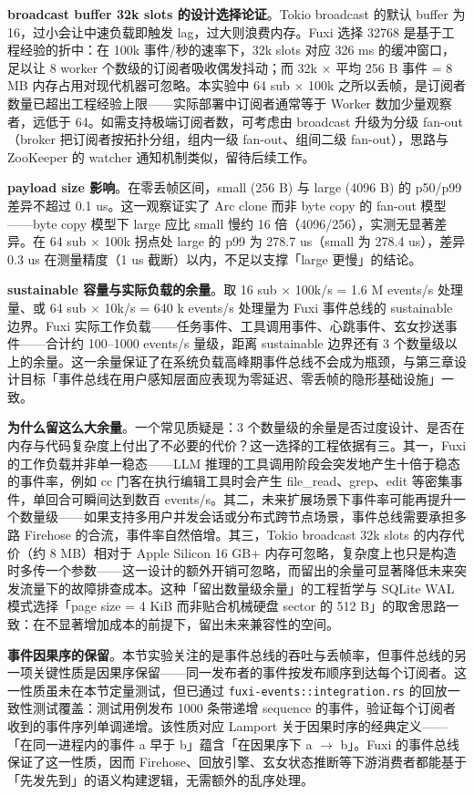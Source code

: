 \textbf{broadcast buffer 32k slots 的设计选择论证}。Tokio broadcast 的默认 buffer 为 16，过小会让中速负载即触发 lag，过大则浪费内存。Fuxi 选择 32768 是基于工程经验的折中：在 100k 事件/秒的速率下，32k slots 对应 326 ms 的缓冲窗口，足以让 8 worker 个数级的订阅者吸收偶发抖动；而 32k × 平均 256 B 事件 = 8 MB 内存占用对现代机器可忽略。本实验中 64 sub × 100k 之所以丢帧，是订阅者数量已超出工程经验上限——实际部署中订阅者通常等于 Worker 数加少量观察者，远低于 64。如需支持极端订阅者数，可考虑由 broadcast 升级为分级 fan-out（broker 把订阅者按拓扑分组，组内一级 fan-out、组间二级 fan-out），思路与 ZooKeeper 的 watcher 通知机制类似\cite{hunt2010zookeeper}，留待后续工作。

\textbf{payload size 影响}。在零丢帧区间，small (256 B) 与 large (4096 B) 的 p50/p99 差异不超过 0.1 us。这一观察证实了 Arc clone 而非 byte copy 的 fan-out 模型——byte copy 模型下 large 应比 small 慢约 16 倍（4096/256），实测无显著差异。在 64 sub × 100k 拐点处 large 的 p99 为 278.7 us（small 为 278.4 us），差异 0.3 us 在测量精度（1 us 截断）以内，不足以支撑「large 更慢」的结论。

\textbf{sustainable 容量与实际负载的余量}。取 16 sub × 100k/s = 1.6 M events/s 处理量、或 64 sub × 10k/s = 640 k events/s 处理量为 Fuxi 事件总线的 sustainable 边界。Fuxi 实际工作负载——任务事件、工具调用事件、心跳事件、玄女抄送事件——合计约 100--1000 events/s 量级，距离 sustainable 边界还有 3 个数量级以上的余量。这一余量保证了在系统负载高峰期事件总线不会成为瓶颈，与第三章设计目标「事件总线在用户感知层面应表现为零延迟、零丢帧的隐形基础设施」一致。

\textbf{为什么留这么大余量}。一个常见质疑是：3 个数量级的余量是否过度设计、是否在内存与代码复杂度上付出了不必要的代价？这一选择的工程依据有三。其一，Fuxi 的工作负载并非单一稳态——LLM 推理的工具调用阶段会突发地产生十倍于稳态的事件率，例如 cc 门客在执行编辑工具时会产生 file\_read、grep、edit 等密集事件，单回合可瞬间达到数百 events/s。其二，未来扩展场景下事件率可能再提升一个数量级——如果支持多用户并发会话或分布式跨节点场景\cite{corbett2012spanner}，事件总线需要承担多路 Firehose 的合流，事件率自然倍增。其三，Tokio broadcast 32k slots 的内存代价（约 8 MB）相对于 Apple Silicon 16 GB+ 内存可忽略，复杂度上也只是构造时多传一个参数——这一设计的额外开销可忽略，而留出的余量可显著降低未来突发流量下的故障排查成本。这种「留出数量级余量」的工程哲学与 SQLite WAL 模式选择「page size = 4 KiB 而非贴合机械硬盘 sector 的 512 B」\cite{sqlite2024wal}的取舍思路一致：在不显著增加成本的前提下，留出未来兼容性的空间。

\textbf{事件因果序的保留}。本节实验关注的是事件总线的吞吐与丢帧率，但事件总线的另一项关键性质是因果序保留——同一发布者的事件按发布顺序到达每个订阅者。这一性质虽未在本节定量测试，但已通过 \texttt{fuxi-events::integration.rs} 的回放一致性测试覆盖：测试用例发布 1000 条带递增 sequence 的事件，验证每个订阅者收到的事件序列单调递增。该性质对应 Lamport 关于因果时序的经典定义\cite{lamport1978time}——「在同一进程内的事件 a 早于 b」蕴含「在因果序下 a $\to$ b」。Fuxi 的事件总线保证了这一性质，因而 Firehose、回放引擎、玄女状态推断等下游消费者都能基于「先发先到」的语义构建逻辑，无需额外的乱序处理。

